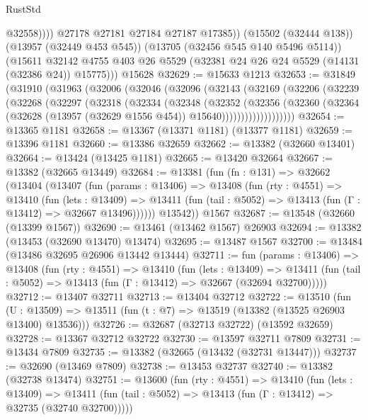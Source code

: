 \begin{lexlean}{RustStd}
\begin{coremodule}
                  @32558))))
          @27178
          @27181
          @27184
          @27187
          @17385))
      (@15502 (@32444 @138))
      (@13957 (@32449 @453 @545))
      (@13705 (@32456 @545 @140 @5496 @5114))
      (@15611 @32142 @4755 @403 @26 @5529 (@32381 @24 @26 @24 @5529 (@14131 (@32386 @24)) @15775)))
    @15628
@32629 := @15633 @1213
@32653 := @31849
    (@31910
      (@31963
        (@32006
          (@32046
            (@32096
              (@32143
                (@32169
                  (@32206
                    (@32239
                      (@32268
                        (@32297
                          (@32318
                            (@32334
                              (@32348
                                (@32352
                                  (@32356
                                    (@32360
                                      (@32364
                                        (@32628
                                          (@13957 (@32629 @1556 @454))
                                          @15640)))))))))))))))))))
@32654 := @13365 @1181
@32658 := @13367 (@13371 @1181) (@13377 @1181)
@32659 := @13396 @1181
@32660 := @13386 @32659
@32662 := @13382 (@32660 @13401)
@32664 := @13424 (@13425 @1181)
@32665 := @13420 @32664
@32667 := @13382 (@32665 @13449)
@32684 := @13381
    (fun (fn : @131) =>
    @32662
      (@13404
        (@13407
          (fun (params : @13406) =>
          @13408
            (fun (rty : @4551) =>
            @13410
              (fun (lets : @13409) =>
              @13411 (fun (tail : @5052) => @13413 (fun (Γ : @13412) => @32667 @13496))))))
        @13542))
    @1567
@32687 := @13548 (@32660 (@13399 @1567))
@32690 := @13461 (@13462 @1567) @26903
@32694 := @13382 (@13453 (@32690 @13470) @13474)
@32695 := @13487 @1567
@32700 := @13484 (@13486 @32695 @26906 @13442 @13444)
@32711 := fun (params : @13406) =>
  @13408
    (fun (rty : @4551) =>
    @13410
      (fun (lets : @13409) =>
      @13411 (fun (tail : @5052) => @13413 (fun (Γ : @13412) => @32667 (@32694 @32700)))))
@32712 := @13407 @32711
@32713 := @13404 @32712
@32722 := @13510
    (fun (U : @13509) => @13511 (fun (t : @7) => @13519 (@13382 (@13525 @26903 @13400) @13536)))
@32726 := @32687 (@32713 @32722) (@13592 @32659)
@32728 := @13367 @32712 @32722
@32730 := @13597 @32711 @7809
@32731 := @13434 @7809
@32735 := @13382 (@32665 (@13432 (@32731 @13447)))
@32737 := @32690 (@13469 @7809)
@32738 := @13453 @32737
@32740 := @13382 (@32738 @13474)
@32751 := @13600
    (fun (rty : @4551) =>
    @13410
      (fun (lets : @13409) =>
      @13411 (fun (tail : @5052) => @13413 (fun (Γ : @13412) => @32735 (@32740 @32700)))))

\end{coremodule}
\end{lexlean}
